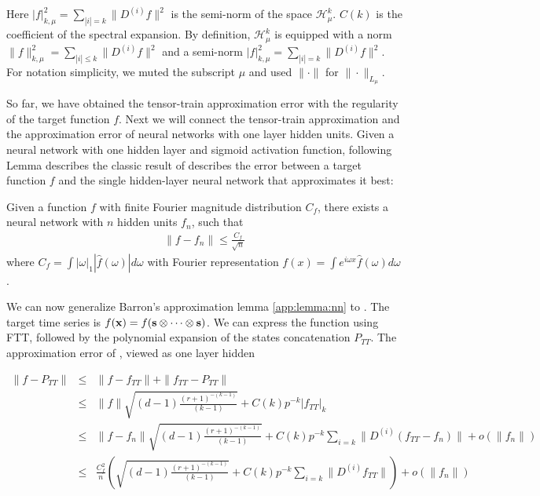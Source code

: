 Here $|f|^2_{k,\mu} =\sum_{|i|=k}\|D^{(i)}f\|^2 $ is the semi-norm of the  space $\mathcal{H}^k_\mu$.  $C(k)$ is the  coefficient of the spectral  expansion.  By definition, $\mathcal{H}^k_\mu$ is equipped with a norm $\|f\|^2_{k,\mu} =\sum_{|i|\leq k}\|D^{(i)}f\|^2$ and a semi-norm $|f|^2_{k,\mu} =\sum_{|i|=k}\|D^{(i)}f\|^2 $. For notation simplicity, we muted the subscript $\mu$ and used $\|\cdot\| $ for $\|\cdot \|_{L_{\mu}}$.

So far, we have obtained the  tensor-train approximation error with the regularity of the target function $f$. Next we will  connect the tensor-train approximation and the approximation error  of neural networks with one layer hidden units. Given a neural network with one hidden layer and sigmoid activation function, following Lemma describes the classic result of  describes the error between a target function $f$ and the single hidden-layer neural network that approximates it best:
%
\begin{lemma}
	Given a function $f$ with finite Fourier magnitude distribution $C_f$, there exists a  neural network with $n$ hidden units $f_n$, such that
	\begin{eqnarray}
	\| f - f_n\| \leq \frac{C_f}{\sqrt{n}}
	\end{eqnarray}
	where $C_f = \int |\omega|_1  | \hat{f}(\omega) | d \omega$ with Fourier representation $f(x)=\int e^{i\omega x}\hat{f}(\omega) d\omega$.
	\label{app:lemma:nn}
\end{lemma}

We can now generalize Barron's approximation lemma \ref{app:lemma:nn} to \trnn{}.  The target time series is  $f({\mathbf{x}}) = f({\mathbf{s}}\otimes \dots \otimes {\mathbf{s}})$.  We can express the function using FTT, followed by the polynomial expansion of the  states concatenation $P_{TT}$. The approximation error of \trnn{}, viewed as one layer hidden 

\begin{eqnarray*}
	\|f- P_{TT}\| & \leq& \|f- f_{TT}\| +\| f_{TT} - P_{TT}\| \\
	&\leq& \|f\|\sqrt{ (d-1)\frac{(r+1)^{-(k-1)}}{(k-1)}} + C(k)p^{-k}|f_{TT}|_k\\
	&\leq& \|f-f_n\|\sqrt{ (d-1)\frac{(r+1)^{-(k-1)}}{(k-1)}} + C(k)p^{-k} \sum\limits_{i=k}  \|D^{(i)}(f_{TT}-f_n)\|  +o(\|f_n\|)\\
	&\leq & \frac{C^2_f}{n} (\sqrt{ (d-1)\frac{(r+1)^{-(k-1)}}{(k-1)}} + C(k)p^{-k} \sum\limits_{i=k}  \|D^{(i)}f_{TT}\| ) +o(\|f_n\|)
\end{eqnarray*}

